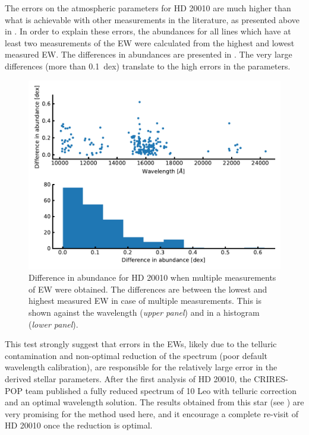 The errors on the atmospheric parameters for HD 20010 are much higher than what is achievable with
other measurements in the literature, as presented above in . In order to explain
these errors, the abundances for all lines which have at least two measurements of the EW were
calculated from the highest and lowest measured EW. The differences in abundances are presented in
. The very large differences (more than \SI{0.1}{dex}) translate to the
high errors in the parameters.

\begin{figure}[htpb!]
    \centering
    \includegraphics[width=0.8\linewidth]{figures/HD20010abundance_error.pdf}
    \caption{Difference in abundance for HD 20010 when multiple measurements of EW were obtained.
             The differences are between the lowest and highest measured EW in case of multiple
             measurements. This is shown against the wavelength (\emph{upper panel}) and in a
             histogram (\emph{lower panel}).}
    \label{fig:HD20010abundance}
\end{figure}

This test strongly suggest that errors in the EWs, likely due to the telluric contamination and
non-optimal reduction of the spectrum (poor default wavelength calibration), are responsible for the
relatively large error in the derived stellar parameters. After the first analysis of HD 20010, the
CRIRES-POP team published a fully reduced spectrum of 10 Leo \citep{Nicholls2017} with telluric
correction and an optimal wavelength solution. The results obtained from this star (see
) are very promising for the method used here, and it encourage a complete re-visit
of HD 20010 once the reduction is optimal.


